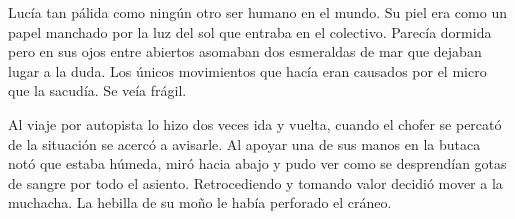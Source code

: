 \vspace*{1cm}

Lucía tan pálida como ningún otro ser humano en el mundo. Su piel era como
un papel manchado por la luz del sol que entraba en el colectivo. Parecía dormida
pero en sus ojos entre abiertos asomaban dos esmeraldas de mar que dejaban 
lugar a la duda. Los únicos movimientos que hacía eran causados por el micro
que la sacudía. Se veía frágil.

Al viaje por autopista lo hizo dos veces ida y vuelta,
cuando el chofer se percató de la situación se acercó a avisarle. Al apoyar una de
sus manos en la butaca notó que estaba húmeda, miró hacia abajo y pudo ver como
se desprendían gotas de sangre por todo el asiento. Retrocediendo y tomando valor
decidió mover a la muchacha. La hebilla de su moño le había perforado el cráneo.
